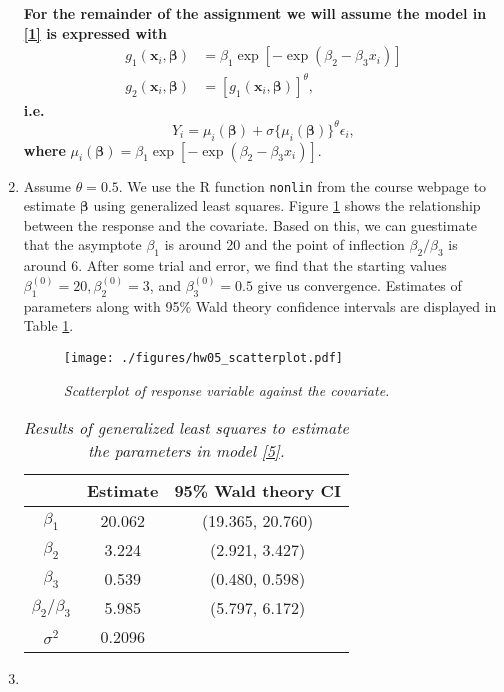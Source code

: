 \documentclass[12pt]{article}
\begin{document}
\begin{enumerate}
    \vspace{2cm}

    \textbf{For the remainder of the assignment we will assume the model in \eqref{1} is expressed with }
    \begin{align}
      g_1(\bm{x}_i,\bm{\beta}) & = \beta_1\exp\left[ -\exp(\beta_2 - \beta_3x_i) \right] \nonumber \\
      g_2(\bm{x}_i, \bm{\beta}) & = [g_1(\bm{x}_i,\bm{\beta})]^{\theta},
      \label{4}
    \end{align}
    \textbf{i.e. }
    \begin{equation}
      Y_i = \mu_i(\bm{\beta}) + \sigma\{\mu_i(\bm{\beta})\}^{\theta}\epsilon_i,
      \label{5}
    \end{equation}
    \textbf{where }$\mu_i(\bm{\beta}) = \beta_1\exp\left[ -\exp(\beta_2 - \beta_3x_i) \right]$.

    \newpage

  \item Assume $\theta = 0.5$. We use the R function \texttt{nonlin} from the course webpage to estimate $\bm{\beta}$ using generalized least squares.
    Figure \ref{scatterplot} shows the relationship between the response and the covariate. Based on this, we can guestimate that the asymptote
    $\beta_1$ is around 20 and the point of inflection $\beta_2 / \beta_3$ is around 6. After some trial and error, we find that the starting values 
    $\beta_{1}^{(0)} = 20, \beta_{2}^{(0)} = 3$, and $\beta_{3}^{(0)} = 0.5$ give us convergence. Estimates of parameters along with 95\% Wald theory
    confidence intervals are displayed in Table \ref{tab2.1}.

    \begin{figure}[h]
      \caption{\emph{Scatterplot of response variable against the covariate.}}
      \centering
      \texttt{[image: ./figures/hw05\_scatterplot.pdf]}
      \label{scatterplot}
    \end{figure}


    \begin{table}[h]
      \caption{\emph{Results of generalized least squares to estimate the parameters in model \eqref{5}.}}
      \vspace{.2cm}
      \centering
      \begin{tabular}{|c|c|c|}
        \hline
         & Estimate & 95\% Wald theory CI \\
        \hline
        $\beta_1$ & 20.062 & (19.365, 20.760) \\
        \hline
        $\beta_2$ & 3.224 & (2.921, 3.427) \\
        \hline
        $\beta_3$ & 0.539 & (0.480, 0.598) \\
        \hline
        $\beta_2 / \beta_3$ & 5.985 & (5.797, 6.172) \\
        \hline
        $\sigma^{2}$ & 0.2096 & \\
        \hline
      \end{tabular}
      \label{tab2.1}
    \end{table}

  \item

\end{enumerate}
\end{document}
